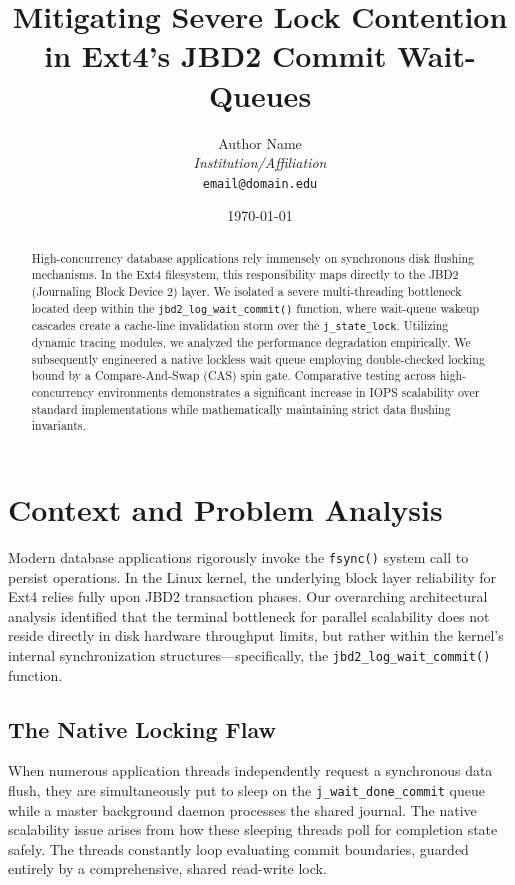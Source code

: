 \documentclass[10pt,a4paper,twocolumn]{article}
\title{Mitigating Severe Lock Contention \\ in Ext4's JBD2 Commit Wait-Queues}
\author{Author Name \\ \textit{Institution/Affiliation} \\ \texttt{email@domain.edu}}
\date{\today}
\begin{document}
\maketitle

\begin{abstract}
High-concurrency database applications rely immensely on synchronous disk flushing mechanisms. In the Ext4 filesystem, this responsibility maps directly to the JBD2 (Journaling Block Device 2) layer. We isolated a severe multi-threading bottleneck located deep within the \texttt{jbd2\_log\_wait\_commit()} function, where wait-queue wakeup cascades create a cache-line invalidation storm over the \texttt{j\_state\_lock}. Utilizing dynamic tracing modules, we analyzed the performance degradation empirically. We subsequently engineered a native lockless wait queue employing double-checked locking bound by a Compare-And-Swap (CAS) spin gate. Comparative testing across high-concurrency environments demonstrates a significant increase in IOPS scalability over standard implementations while mathematically maintaining strict data flushing invariants.
\end{abstract}

\section{Context and Problem Analysis}
\label{sec:problem}

Modern database applications rigorously invoke the \texttt{fsync()} system call to persist operations. In the Linux kernel, the underlying block layer reliability for Ext4 relies fully upon JBD2 transaction phases. Our overarching architectural analysis identified that the terminal bottleneck for parallel scalability does not reside directly in disk hardware throughput limits, but rather within the kernel's internal synchronization structures---specifically, the \texttt{jbd2\_log\_wait\_commit()} function.

\subsection{The Native Locking Flaw}
When numerous application threads independently request a synchronous data flush, they are simultaneously put to sleep on the \texttt{j\_wait\_done\_commit} queue while a master background daemon processes the shared journal. The native scalability issue arises from how these sleeping threads poll for completion state safely. The threads constantly loop evaluating commit boundaries, guarded entirely by a comprehensive, shared read-write lock.
\end{document}
